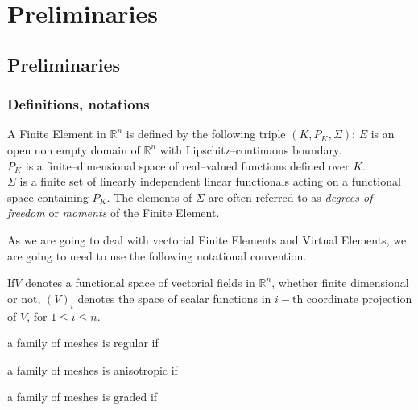 \chapter{Preliminaries}
\label{chap_prelim}
\section{Preliminaries} %
\label{sec:preliminaries}
\subsection{Definitions, notations} %
\label{sub:definitions_notations}
\begin{defi}
A Finite Element in $\mathbb{R}^n$ is defined by the following triple $(K, P_K, \Sigma) $:
\vspace{5pt}
\noindent
$E$ is an open non empty domain of $\mathbb{R}^n$ with Lipschitz--continuous 
boundary.\\[5pt]
\noindent
$P_K$ is a finite--dimensional space of real--valued functions defined over $K$.\\[5pt]
\noindent
$\Sigma$ is a finite set of linearly independent linear functionals acting 
on a functional space containing $P_K$. The elements of $\Sigma$ are often
referred to as  \emph{degrees of freedom} or \emph{moments} of the Finite
Element.
\end{defi}
\noindent As we are going to deal with vectorial Finite Elements and
Virtual Elements, we are going to need to use the following notational convention.
\begin{defi} If\hspace{7pt}$V$ denotes a functional space of vectorial
fields in $\mathbb{R}^n$, whether finite dimensional
or not, $(V)_i$ denotes the space of scalar functions in $i-$th
coordinate projection
of $V$, for $1\leqslant i\leqslant n$.
\end{defi}

\begin{defi} a family of meshes is regular if 
\end{defi}

\begin{defi} a family of meshes is anisotropic if 
\end{defi}

\begin{defi} a family of meshes is graded if 
\end{defi}

